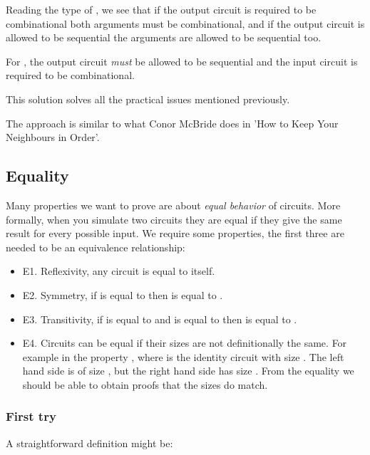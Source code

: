
Reading the type of , we see that if the output circuit is
required to be combinational both arguments must be combinational, and
if the output circuit is allowed to be sequential the arguments are
allowed to be sequential too.

For , the output circuit \emph{must} be allowed to be
sequential and the input circuit is required to be combinational.

This solution solves all the practical issues mentioned previously.

The approach is similar to what Conor McBride does in 'How to Keep
Your Neighbours in Order'.

\subsection{Equality}\label{equality}

Many properties we want to prove are about \emph{equal behavior} of
circuits. More formally, when you simulate two circuits they are equal
if they give the same result for every possible input. We require some
properties, the first three are needed to be an equivalence
relationship:

\begin{itemize}
\item E1. Reflexivity, any circuit is equal to itself.
\item E2. Symmetry, if  is equal to  then  is equal
  to .
\item E3. Transitivity, if  is equal to  and  is
  equal to  then  is equal to .
\item E4. Circuits can be equal if their sizes are not definitionally
  the same.
For example in the property     
, where   is the identity circuit with size .
The left hand side is of size  \AF{+} , but the right hand
side has size .
From the equality we should be able to obtain proofs that the sizes do
match.
\end{itemize}

\subsubsection{First try}\label{first-try}

A straightforward definition might be:

